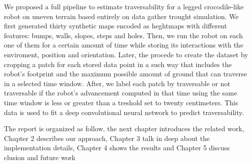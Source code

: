 \documentclass[../document.tex]{subfiles}
\begin{document}
We proposed a full pipeline to estimate traversability for a legged crocodile-like robot on uneven terrain based entirely on data gather trought simulation. We first generated thirty synthetic maps encoded as heghtmaps with different features: bumps, walls, slopes, steps and holes. Then, we run the robot on each one of them for a certain amount of time while storing its interactions with the enviroment, position and orientation. Later, the procede to create the dataset by cropping a patch for each stored data point in a such way that includes the robot's footprint and the maximum possible amount of ground that can traverse in a selected time window. After, we label each patch by traversable or not traversable if the robot's advancement computed in that time using the same time window is less or greater than a treshold set to twenty centimeters. This data is used to fit a deep convolutional neural network to predict traversability. 

The report is organized as follow, the next chapter  introduces the related work, Chapter 2 describes our approach, Chapter 3 talk in deep about the implementation details,
Chapter 4 shows the results and Chapter 5 discuss clusion and future work
\end{document}
